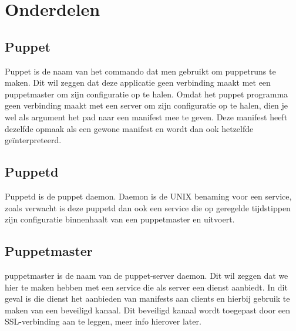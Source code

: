 \section{Onderdelen}

\subsection{Puppet}
Puppet is de naam van het commando dat men gebruikt om puppetruns te maken. Dit wil zeggen dat deze applicatie geen verbinding maakt met een puppetmaster om zijn configuratie op te halen. Omdat het puppet programma geen verbinding maakt met een server om zijn configuratie op te halen, dien je wel als argument het pad naar een manifest mee te geven. Deze manifest heeft dezelfde opmaak als een gewone manifest en wordt dan ook hetzelfde ge\"interpreteerd.

\subsection{Puppetd}
Puppetd is de puppet daemon. Daemon is de UNIX benaming voor een service, zoals verwacht is deze puppetd dan ook een service die op geregelde tijdstippen zijn configuratie binnenhaalt van een puppetmaster en uitvoert.

\subsection{Puppetmaster}
puppetmaster is de naam van de puppet-server daemon. Dit wil zeggen dat we hier te maken hebben met een service die als server een dienst aanbiedt. In dit geval is die dienst het aanbieden van manifests aan clients en hierbij gebruik te maken van een beveiligd kanaal. Dit beveiligd kanaal wordt toegepast door een SSL-verbinding aan te leggen, meer info hierover later.

